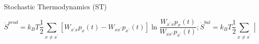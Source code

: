 \documentclass[final]{beamer}
\newlength{\colwidth}
\begin{document}
\begin{frame}[t]
\begin{columns}[t]
\begin{column}{\colwidth}
\begin{block}{Stochastic Thermodynamics (ST)}
\begin{itemize}
%
\begin{subequations}
\begin{equation*}
\dot{S}^{prod}  = k_B T\frac{1}{2} \sum_{x \neq x^\prime} \left[ W_{x^\prime x} p_x(t) -  W_{x x^\prime}p_{x^\prime}(t) \right] \ln \frac{W_{x^\prime x} p_x(t)}{W_{xx^\prime}p_{x^\prime}(t)};
\end{equation*}
\begin{equation*}
 \dot{S}^{bal} = k_B T \frac{1}{2} \sum_{x \neq x^\prime} \left[ W_{x^\prime x} p_x(t) -  W_{x x^\prime}p_{x^\prime}(t) \right] \ln \frac{p_x(t)}{p_{x^\prime}(t)}.
\end{equation*}
\end{subequations}

\end{itemize}


\end{block}
\end{column}
\end{columns}
\end{frame}
\end{document}
